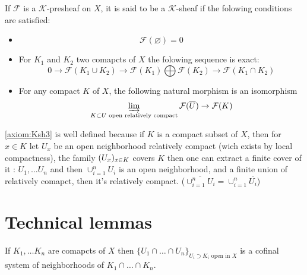 \begin{definition}\label{def:K_sheaves}
    If $\mathcal{F}$ is a $\mathcal{K}$-presheaf on $X$, it is said to be a $\mathcal{K}$-sheaf if the folowing conditions are satisfied:\begin{itemize}
    \item\begin{equation}\label{axiom:Ksh1}
        \mathcal{F}(\varnothing)=0
    \end{equation}
    \item For $K_1$ and $K_2$ two comapcts of $X$ the folowing sequence is exact:\begin{equation}\label{axiom:Ksh2}
         0\to\mathcal{F}(K_1\cup K_2)\to \mathcal{F}(K_1)\bigoplus\mathcal{F}(K_2)\to \mathcal{F}(K_1\cap K_2) 
    \end{equation}
    \item For any compact $K$ of $X$, the following natural morphism is an isomorphism\begin{equation}\label{axiom:Ksh3}
        \varinjlim\limits_{K\subset U\text{ open relatively compact}}\mathcal{F}(\overline{U})\to \mathcal{F}(K)
    \end{equation}
\end{itemize}
\end{definition}

\begin{remark}
    \eqref{axiom:Ksh3} is well defined because if $K$ is a compact subset of $X$, then for $x\in K$ let $U_x$ be an open neighborhood relatively compact (wich exists by local compactness), the family $(U_x)_{x\in K}$ covers $K$ then one can extract a finite cover of it : $U_1,\ldots U_n$ and then $\cup_{i=1}^n U_i$ is an open neighborhood, and a finite union of relatively comapct, then it's relatively compact. ($\overline{\cup_{i=1}^n U_i}=\cup_{i=1}^n \overline{U_i}$)
\end{remark}


\section{Technical lemmas}

\begin{lemma}\label{lem:cofinal_syst_of_inter_compact}
    If $K_1,\ldots K_n$ are comapcts of $X$ then $\{U_1\cap\ldots\cap U_n\}_{U_i\supset K_i\text{ open in }X}$ is a cofinal system of neighborhoods of $K_1\cap \ldots \cap K_n$.
\end{lemma}


